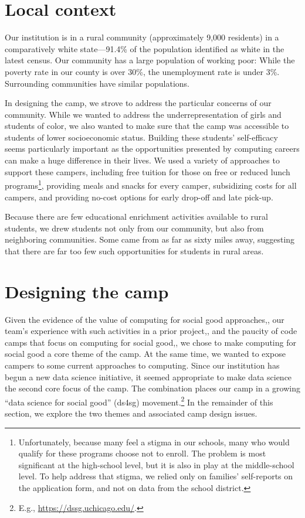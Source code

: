 \section{Local context}

Our institution is in a rural community (approximately 9,000
residents) in a comparatively white state---91.4\% of the population identified as white
in the latest census.  Our community has a large population of
working poor: While the poverty rate in our county is over 30\%,
the unemployment rate is under 3\%.  Surrounding communities have
similar populations.

In designing the camp, we strove to address the particular concerns
of our community.  While we wanted to address the underrepresentation
of girls and students of color, we also wanted to make sure that
the camp was accessible to students of lower socioeconomic status.
Building these students' self-efficacy seems particularly important
as the opportunities presented by computing careers can make a huge
difference in their lives.  We used a variety of approaches to
support these campers, including free tuition for those on free
or reduced lunch programs\footnote{Unfortunately, because many feel
a stigma in our schools, many who would qualify for these
programs choose not to enroll.  The problem is most significant at
the high-school level, but it is also in play at the
middle-school level.  To help address that stigma, we relied only
on families' self-reports on the application form, and not on data
from the school district.}, providing meals and snacks for every
camper, subsidizing costs for all campers, and providing no-cost
options for early drop-off and late pick-up.

Because there are few educational enrichment activities available
to rural students, we drew students not only from our community,
but also from neighboring communities.  Some came from as far as
sixty miles away, suggesting that there are far too few such
opportunities for students in rural areas.

\section{Designing the camp}

Given the evidence of the value of computing for social good
approaches,\cite{Goldweber2013,Goldweber2018}, our team's experience
with such activities in a prior project,\cite{arts-coding}, and the
paucity of code camps that focus on computing for social
good,\cite{DeWitt2017}, we chose to make
computing for social good a core theme of the camp.  At the same
time, we wanted to expose campers to some current approaches to
computing.  Since our institution has begun a new data science
initiative, it seemed appropriate to make data science the second
core focus of the camp.  The combination places our camp in a growing
``data science for social good'' (ds4sg) movement.\footnote{E.g.,
\url{https://dssg.uchicago.edu/}.}  
In the remainder of this section, we explore the two themes and
associated camp design issues.

